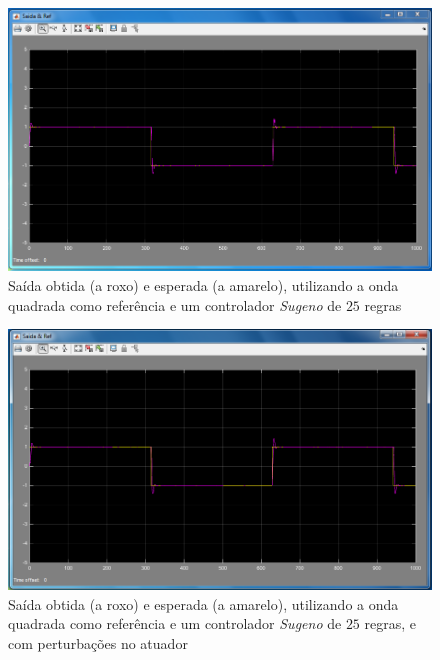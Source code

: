 \documentclass{article}
\begin{document}
\begin{figure}[h]
  \centering
      \includegraphics[scale=0.3]{Images/Sugeno_25_square.png}
  \caption{Saída obtida (a roxo) e esperada (a amarelo), utilizando a onda quadrada como referência e um controlador \emph{Sugeno} de $25$ regras}
\end{figure}

\begin{figure}[h]
  \centering
      \includegraphics[scale=0.3]{Images/Sugeno_25_square_actuator.png}
  \caption{Saída obtida (a roxo) e esperada (a amarelo), utilizando a onda quadrada como referência e um controlador \emph{Sugeno} de $25$ regras, e com perturbações no atuador}
\end{figure}
\end{document}
